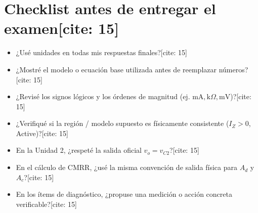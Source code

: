 \documentclass[10pt, a4paper]{article}
\begin{document}
\section*{Checklist antes de entregar el examen[cite: 15]}
\begin{itemize}
    \setlength\itemsep{0em}
    \item[$\square$] ¿Usé unidades en todas mis respuestas finales?[cite: 15]
    \item[$\square$] ¿Mostré el modelo o ecuación base utilizada antes de reemplazar números?[cite: 15]
    \item[$\square$] ¿Revisé los signos lógicos y los órdenes de magnitud (ej. $\text{mA}, \text{k}\Omega, \text{mV}$)?[cite: 15]
    \item[$\square$] ¿Verifiqué si la región / modelo supuesto es físicamente consistente ($I_Z > 0$, Active)?[cite: 15]
    \item[$\square$] En la Unidad 2, ¿respeté la salida oficial $v_o = v_{C2}$?[cite: 15]
    \item[$\square$] En el cálculo de CMRR, ¿usé la misma convención de salida física para $A_d$ y $A_c$?[cite: 15]
    \item[$\square$] En los ítems de diagnóstico, ¿propuse una medición o acción concreta verificable?[cite: 15]
\end{itemize}
\end{document}
